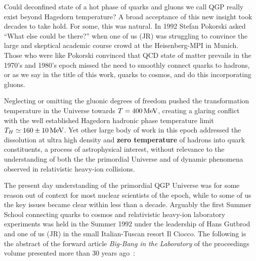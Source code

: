 Could deconfined state of a hot phase of quarks and gluons we call QGP really exist beyond Hagedorn temperature? A broad acceptance of this new insight took decades to take hold. For some, this was natural. In 1992 Stefan Pokorski asked ``What else could be there?'' when one of us (JR) was struggling to convince the large and skeptical academic course crowd at the Heisenberg-MPI in Munich. Those who were like Pokorski convinced that QCD state of matter prevails in the 1970's and 1980's epoch missed the need to smoothly connect quarks to hadrons, or as we say in the title of this work, quarks to cosmos, and do this incorporating gluons. 

Neglecting or omitting the gluonic degrees of freedom pushed the transformation temperature in the Universe towards $T=400\text{\,MeV}$, creating a glaring conflict with the well established Hagedorn hadronic phase temperature limit $T_H\simeq 160\pm 10\text{\,MeV}$. Yet other large body of work in this epoch addressed the dissolution at ultra high density and {\bf zero temperature} of hadrons into quark constituents, a process of astrophysical interest, without relevance to the understanding of both the the primordial Universe and of dynamic phenomena observed in relativistic heavy-ion collisions.

The present day understanding of the primordial QGP Universe was for some reason out of context for most nuclear scientists of the epoch, while to some of us the key issues became clear within less than a decade. Arguably the first Summer School connecting quarks to cosmos and relativistic heavy-ion laboratory experiments was held in the Summer 1992 under the leadership of Hans Gutbrod and one of us (JR) in the small Italian-Tuscan resort Il Ciocco. The following is the abstract of the forward article {\it Big-Bang in the Laboratory} of the proceedings volume presented more than 30 years ago~\cite{Gutbrod1993}: 

